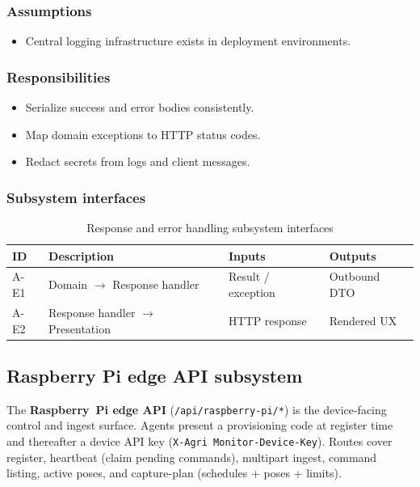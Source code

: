 \subsubsection{Assumptions}
\begin{itemize}
  \item Central logging infrastructure exists in deployment environments.
\end{itemize}

\subsubsection{Responsibilities}
\begin{itemize}
  \item Serialize success and error bodies consistently.
  \item Map domain exceptions to HTTP status codes.
  \item Redact secrets from logs and client messages.
\end{itemize}

\subsubsection{Subsystem interfaces}
\begin{table}[H]
\centering
\small
\begin{tabular}{|p{0.9cm}|p{3.4cm}|p{3.0cm}|p{3.5cm}|}
\hline
\textbf{ID} & \textbf{Description} & \textbf{Inputs} & \textbf{Outputs} \\
\hline
A-E1 & Domain $\rightarrow$ Response handler & Result / exception & Outbound DTO \\
\hline
A-E2 & Response handler $\rightarrow$ Presentation & HTTP response & Rendered UX \\
\hline
\end{tabular}
\caption{Response and error handling subsystem interfaces}
\end{table}

\subsection{Raspberry Pi edge API subsystem}

The \textbf{Raspberry~Pi edge API} (\texttt{/api/raspberry-pi/*}) is the device-facing control and ingest surface. Agents present a provisioning code at register time and thereafter a device API key (\texttt{X-Agri Monitor-Device-Key}). Routes cover register, heartbeat (claim pending commands), multipart ingest, command listing, active poses, and capture-plan (schedules + poses + limits).

